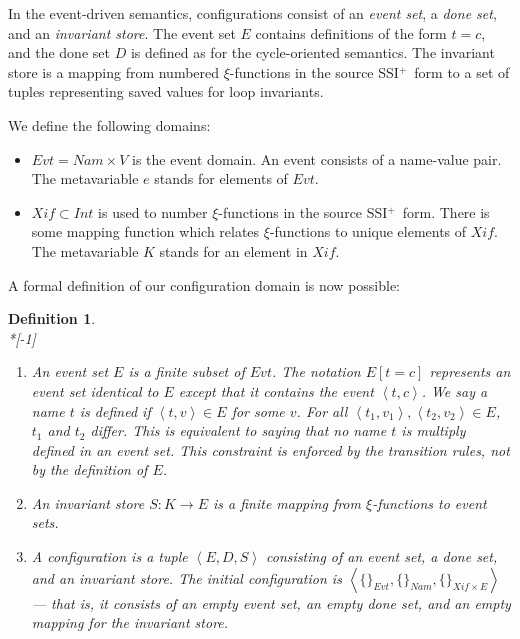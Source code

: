 \documentclass[12pt,notitlepage,twoside]{article}
\newtheorem{definition}{Definition}
\newcommand{\xifunction}{$\xi$-function}
\newcommand{\tuple}[1]{\ensuremath{\left\langle #1 \right\rangle}}
\newcommand{\ssiplus}{SSI$^+$}
\begin{document}
In the event-driven semantics, configurations consist of an
\emph{event set}, a \emph{done set}, and an \emph{invariant store}.
The event set $E$ contains definitions of the form $t=c$, and the done
set $D$ is defined as for the cycle-oriented semantics.  The invariant
store is a mapping from numbered \xifunction{s} in the source
\ssiplus\ form to a set of tuples representing saved values for loop
invariants.

We define the following domains:
\begin{itemize}
\item $\mathit{Evt} = \mathit{Nam} \times V$ is the event domain.  An
event consists of a name-value pair.  The metavariable $e$ stands for
elements of $\mathit{Evt}$.
\item $\mathit{Xif} \subset \mathit{Int}$ is used to number
\xifunction{s} in the source \ssiplus\ form.  There is some mapping
function which relates \xifunction{s} to unique elements of
$\mathit{Xif}$.  The metavariable $K$ stands for an element in
$\mathit{Xif}$.
\end{itemize}

A formal definition of our configuration domain is now possible:
\begin{definition}~\\*[-1\baselineskip]
\begin{enumerate}
\item An \emph{event set} $E$ is a finite subset of $\mathit{Evt}$.
The notation $E[t=c]$ represents an event set identical to $E$ except
that it contains the event $\tuple{t,c}$.  We say a name $t$ is
\emph{defined} if $\tuple{t,v} \in E$ for some $v$.  For all
$\tuple{t_1,v_1},\tuple{t_2,v_2} \in E$, $t_1$ and $t_2$ differ.  This is
equivalent to saying that no name $t$ is multiply defined in an event
set.  This constraint is enforced by the transition rules, 
not by the definition of $E$.
\item An \emph{invariant store} $S: K \to E$ is a finite mapping from
\xifunction{s} to event sets.
\item A \emph{configuration} is a tuple $\tuple{E, D, S}$ consisting
of an event set, a done set, and an invariant store.  The initial
configuration is
$\tuple{\{\}_{\mathit{Evt}},
        \{\}_{\mathit{Nam}},
        \{\}_{\mathit{Xif} \times E}}$ ---
that is, it consists of an empty event set, an empty done set, and
an empty mapping for the invariant store.
\end{enumerate}
\end{definition}
\end{document}
